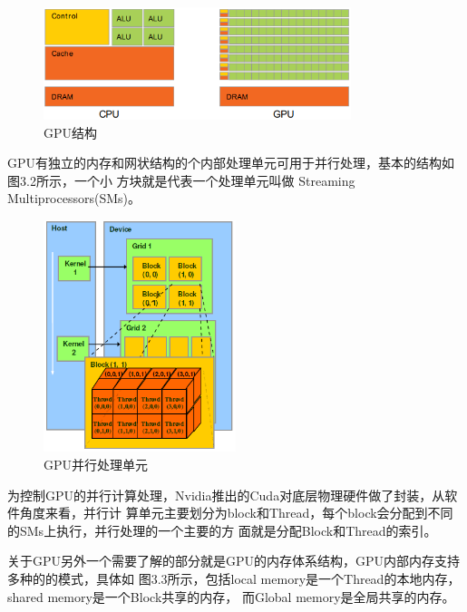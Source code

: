 \documentclass[a4paper,12pt]{report}
\begin{document}
\begin{spacing}{1.5}
\begin{figure}[hbtp]
    \centering
    \includegraphics [width=0.8\textwidth]{figure//GpuStruct.png}
    \caption{GPU结构}\label{GpuStruct}
\end{figure}

GPU有独立的内存和网状结构的个内部处理单元可用于并行处理，基本的结构如图3.2所示，一个小
方块就是代表一个处理单元叫做 Streaming Multiprocessors(SMs)。    

\begin{figure}[hbtp]
    \centering
    \includegraphics [width=0.5\textwidth]{figure//block.png}
    \caption{GPU并行处理单元}\label{block}
\end{figure}


为控制GPU的并行计算处理，Nvidia推出的Cuda对底层物理硬件做了封装，从软件角度来看，并行计
算单元主要划分为block和Thread，每个block会分配到不同的SMs上执行，并行处理的一个主要的方
面就是分配Block和Thread的索引。

关于GPU另外一个需要了解的部分就是GPU的内存体系结构，GPU内部内存支持多种的的模式，具体如
图3.3所示，包括local memory是一个Thread的本地内存，shared memory是一个Block共享的内存，
而Global memory是全局共享的内存。


\end{spacing}
\end{document}
